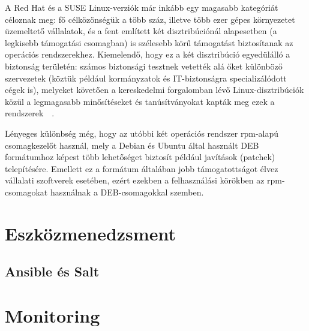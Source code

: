 A Red Hat és a SUSE Linux-verziók már inkább egy magasabb kategóriát céloznak meg: fő célközönségük a több száz, illetve több ezer gépes környezetet üzemeltető vállalatok, és a fent említett két disztribúciónál alapesetben (a legkisebb támogatási csomagban) is szélesebb körű támogatást biztosítanak az operációs rendszerekhez. Kiemelendő, hogy ez a két disztribúció egyedülálló a biztonság területén: számos biztonsági tesztnek vetették alá őket különböző szervezetek (köztük például kormányzatok és IT-biztonságra specializálódott cégek is), melyeket követően a kereskedelmi forgalomban lévő Linux-disztribúciók közül a legmagasabb minősítéseket és tanúsítványokat kapták meg ezek a rendszerek~\cite{RhSec}~\cite{SlesSec}.

Lényeges különbség még, hogy az utóbbi két operációs rendszer \acrshort{rpm}-alapú csomagkezelőt használ, mely a Debian és Ubuntu által használt DEB formátumhoz képest több lehetőséget biztosít például javítások (patchek) telepítésére. Emellett ez a formátum általában jobb támogatottságot élvez vállalati szoftverek esetében, ezért ezekben a felhasználási körökben az \acrshort{rpm}-csomagokat használnak a DEB-csomagokkal szemben.


\section{Eszközmenedzsment}


\subsection{Ansible és Salt}

\section{Monitoring}